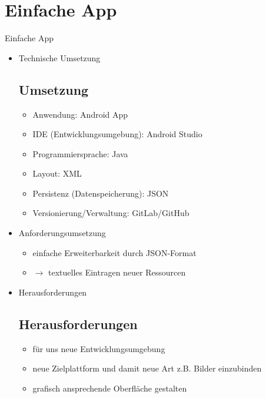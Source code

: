 \documentclass[10pt,fleqn]{beamer}
\begin{document}
\section{Einfache App}
\begin{frame}[t]{Einfache App}
	\begin{itemize}
		\item Technische Umsetzung
		\subsection{Umsetzung}
		\begin{itemize}
			\item Anwendung: Android App
			\item IDE (Entwicklungsumgebung): Android Studio
			\item Programmiersprache: Java
			\item Layout: XML
			\item Persistenz (Datenspeicherung): JSON
			\item Versionierung/Verwaltung: GitLab/GitHub
		\end{itemize}
		\item Anforderungsumsetzung
			\begin{itemize}
			\item einfache Erweiterbarkeit durch JSON-Format
			\item[] $\rightarrow$ textuelles Eintragen neuer Ressourcen
			\end{itemize}
		\item Herausforderungen
		\subsection{Herausforderungen}
		\begin{itemize}
			\item für uns neue Entwicklungsumgebung
			\item neue Zielplattform und damit neue Art z.B. Bilder einzubinden
			\item grafisch ansprechende Oberfläche gestalten
		\end{itemize}
	\end{itemize}
\end{frame}
\end{document}
